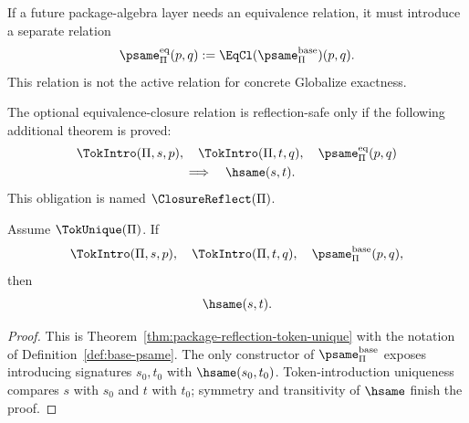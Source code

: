 \begin{definition}
\label{def:psame-eq}
If a future package-algebra layer needs an equivalence relation, it must introduce a separate relation
$$
  \psame_{\Pi}^{\mathrm{eq}}(p,q)
  := \EqCl(\psame_{\Pi}^{\mathrm{base}})(p,q).
$$
This relation is not the active relation for concrete Globalize exactness.
\end{definition}

\begin{definition}
\label{def:closure-reflection}
The optional equivalence-closure relation is reflection-safe only if the following additional theorem is proved:
$$
\begin{aligned}
  &\TokIntro(\Pi,s,p),\quad
    \TokIntro(\Pi,t,q),\quad
    \psame_{\Pi}^{\mathrm{eq}}(p,q)\\
  &\hspace{3.0cm}\Longrightarrow\quad \hsame(s,t).
\end{aligned}
$$
This obligation is named \(\ClosureReflect(\Pi)\).
\end{definition}

\begin{theorem}
\label{thm:base-reflection-active}
Assume \(\TokUnique(\Pi)\). If
$$
  \TokIntro(\Pi,s,p),\quad
  \TokIntro(\Pi,t,q),\quad
  \psame_{\Pi}^{\mathrm{base}}(p,q),
$$
then
$$
  \hsame(s,t).
$$
\end{theorem}

\begin{proof}
This is Theorem~\ref{thm:package-reflection-token-unique} with the notation of Definition~\ref{def:base-psame}. The only constructor of \(\psame_{\Pi}^{\mathrm{base}}\) exposes introducing signatures \(s_0,t_0\) with \(\hsame(s_0,t_0)\). Token-introduction uniqueness compares \(s\) with \(s_0\) and \(t\) with \(t_0\); symmetry and transitivity of \(\hsame\) finish the proof.
\end{proof}

